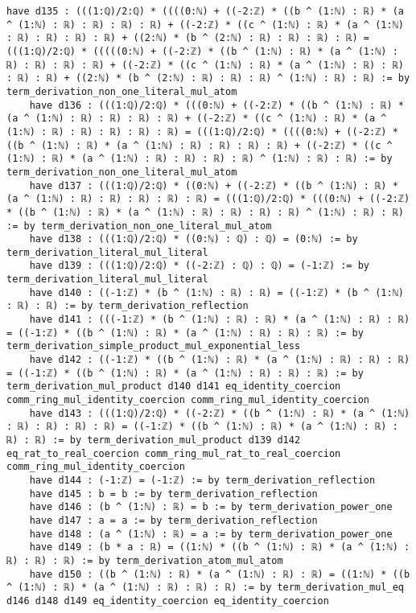 \documentclass{article}
\begin{document}
\begin{tcolorbox}[colback=white!10, width=\linewidth]
\begin{lstlisting}[language=Lean4]
    have d135 : (((1:ℚ)/2:ℚ) * ((((0:ℕ) + ((-2:ℤ) * ((b ^ (1:ℕ) : ℝ) * (a ^ (1:ℕ) : ℝ) : ℝ) : ℝ) : ℝ) + ((-2:ℤ) * ((c ^ (1:ℕ) : ℝ) * (a ^ (1:ℕ) : ℝ) : ℝ) : ℝ) : ℝ) + ((2:ℕ) * (b ^ (2:ℕ) : ℝ) : ℝ) : ℝ) : ℝ) = (((1:ℚ)/2:ℚ) * (((((0:ℕ) + ((-2:ℤ) * ((b ^ (1:ℕ) : ℝ) * (a ^ (1:ℕ) : ℝ) : ℝ) : ℝ) : ℝ) + ((-2:ℤ) * ((c ^ (1:ℕ) : ℝ) * (a ^ (1:ℕ) : ℝ) : ℝ) : ℝ) : ℝ) + ((2:ℕ) * (b ^ (2:ℕ) : ℝ) : ℝ) : ℝ) ^ (1:ℕ) : ℝ) : ℝ) := by term_derivation_non_one_literal_mul_atom
    have d136 : (((1:ℚ)/2:ℚ) * (((0:ℕ) + ((-2:ℤ) * ((b ^ (1:ℕ) : ℝ) * (a ^ (1:ℕ) : ℝ) : ℝ) : ℝ) : ℝ) + ((-2:ℤ) * ((c ^ (1:ℕ) : ℝ) * (a ^ (1:ℕ) : ℝ) : ℝ) : ℝ) : ℝ) : ℝ) = (((1:ℚ)/2:ℚ) * ((((0:ℕ) + ((-2:ℤ) * ((b ^ (1:ℕ) : ℝ) * (a ^ (1:ℕ) : ℝ) : ℝ) : ℝ) : ℝ) + ((-2:ℤ) * ((c ^ (1:ℕ) : ℝ) * (a ^ (1:ℕ) : ℝ) : ℝ) : ℝ) : ℝ) ^ (1:ℕ) : ℝ) : ℝ) := by term_derivation_non_one_literal_mul_atom
    have d137 : (((1:ℚ)/2:ℚ) * ((0:ℕ) + ((-2:ℤ) * ((b ^ (1:ℕ) : ℝ) * (a ^ (1:ℕ) : ℝ) : ℝ) : ℝ) : ℝ) : ℝ) = (((1:ℚ)/2:ℚ) * (((0:ℕ) + ((-2:ℤ) * ((b ^ (1:ℕ) : ℝ) * (a ^ (1:ℕ) : ℝ) : ℝ) : ℝ) : ℝ) ^ (1:ℕ) : ℝ) : ℝ) := by term_derivation_non_one_literal_mul_atom
    have d138 : (((1:ℚ)/2:ℚ) * ((0:ℕ) : ℚ) : ℚ) = (0:ℕ) := by term_derivation_literal_mul_literal
    have d139 : (((1:ℚ)/2:ℚ) * ((-2:ℤ) : ℚ) : ℚ) = (-1:ℤ) := by term_derivation_literal_mul_literal
    have d140 : ((-1:ℤ) * (b ^ (1:ℕ) : ℝ) : ℝ) = ((-1:ℤ) * (b ^ (1:ℕ) : ℝ) : ℝ) := by term_derivation_reflection
    have d141 : (((-1:ℤ) * (b ^ (1:ℕ) : ℝ) : ℝ) * (a ^ (1:ℕ) : ℝ) : ℝ) = ((-1:ℤ) * ((b ^ (1:ℕ) : ℝ) * (a ^ (1:ℕ) : ℝ) : ℝ) : ℝ) := by term_derivation_simple_product_mul_exponential_less
    have d142 : ((-1:ℤ) * ((b ^ (1:ℕ) : ℝ) * (a ^ (1:ℕ) : ℝ) : ℝ) : ℝ) = ((-1:ℤ) * ((b ^ (1:ℕ) : ℝ) * (a ^ (1:ℕ) : ℝ) : ℝ) : ℝ) := by term_derivation_mul_product d140 d141 eq_identity_coercion comm_ring_mul_identity_coercion comm_ring_mul_identity_coercion
    have d143 : (((1:ℚ)/2:ℚ) * ((-2:ℤ) * ((b ^ (1:ℕ) : ℝ) * (a ^ (1:ℕ) : ℝ) : ℝ) : ℝ) : ℝ) = ((-1:ℤ) * ((b ^ (1:ℕ) : ℝ) * (a ^ (1:ℕ) : ℝ) : ℝ) : ℝ) := by term_derivation_mul_product d139 d142 eq_rat_to_real_coercion comm_ring_mul_rat_to_real_coercion comm_ring_mul_identity_coercion
    have d144 : (-1:ℤ) = (-1:ℤ) := by term_derivation_reflection
    have d145 : b = b := by term_derivation_reflection
    have d146 : (b ^ (1:ℕ) : ℝ) = b := by term_derivation_power_one
    have d147 : a = a := by term_derivation_reflection
    have d148 : (a ^ (1:ℕ) : ℝ) = a := by term_derivation_power_one
    have d149 : (b * a : ℝ) = ((1:ℕ) * ((b ^ (1:ℕ) : ℝ) * (a ^ (1:ℕ) : ℝ) : ℝ) : ℝ) := by term_derivation_atom_mul_atom
    have d150 : ((b ^ (1:ℕ) : ℝ) * (a ^ (1:ℕ) : ℝ) : ℝ) = ((1:ℕ) * ((b ^ (1:ℕ) : ℝ) * (a ^ (1:ℕ) : ℝ) : ℝ) : ℝ) := by term_derivation_mul_eq d146 d148 d149 eq_identity_coercion eq_identity_coercion

\end{lstlisting}
\end{tcolorbox}
\end{document}
